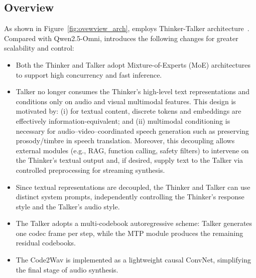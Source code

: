 \subsection{Overview}
As shown in Figure~\ref{fig:ovewview_arch}, \method employs Thinker-Talker architecture~\citep{qwen2.5omni}. Compared with Qwen2.5-Omni, \method introduces the following changes for greater scalability and control:
\begin{itemize}
    \item Both the Thinker and Talker adopt Mixture-of-Experts (MoE) architectures to support high concurrency and fast inference.
    \item Talker no longer consumes the Thinker’s high-level text representations and conditions only on audio and visual multimodal features. This design is motivated by: (i) for textual content, discrete tokens and embeddings are effectively information-equivalent; and (ii) multimodal conditioning is necessary for audio–video–coordinated speech generation such as preserving prosody/timbre in speech translation. Moreover, this decoupling allows external modules (e.g., RAG, function calling, safety filters) to intervene on the Thinker’s textual output and, if desired, supply text to the Talker via controlled preprocessing for streaming synthesis.
    \item Since textual representations are decoupled, the Thinker and Talker can use distinct system prompts, independently controlling the Thinker’s response style and the Talker’s audio style.
    \item The Talker adopts a multi-codebook autoregressive scheme: Talker generates one codec frame per step, while the MTP module produces the remaining residual codebooks.
    \item The Code2Wav is implemented as a lightweight causal ConvNet,  simplifying the final stage of audio synthesis.
\end{itemize}

